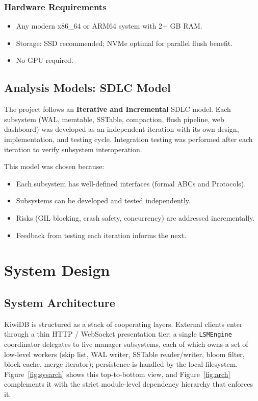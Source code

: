 \documentclass[oneside,a4paper,12pt]{book}
\begin{document}
\subsection{Hardware Requirements}
\begin{itemize}[leftmargin=2em]
    \item Any modern x86\_64 or ARM64 system with 2+ GB RAM.
    \item Storage: SSD recommended; NVMe optimal for parallel flush benefit.
    \item No GPU required.
\end{itemize}

\section{Analysis Models: SDLC Model}

The project follows an \textbf{Iterative and Incremental} SDLC model. Each subsystem (WAL, memtable, SSTable, compaction, flush pipeline, web dashboard) was developed as an independent iteration with its own design, implementation, and testing cycle. Integration testing was performed after each iteration to verify subsystem interoperation.

This model was chosen because:
\begin{itemize}[leftmargin=2em]
    \item Each subsystem has well-defined interfaces (formal ABCs and Protocols).
    \item Subsystems can be developed and tested independently.
    \item Risks (GIL blocking, crash safety, concurrency) are addressed incrementally.
    \item Feedback from testing each iteration informs the next.
\end{itemize}


\chapter{System Design}

\section{System Architecture}

KiwiDB is structured as a stack of cooperating layers. External clients enter through a thin HTTP / WebSocket presentation tier; a single \texttt{LSMEngine} coordinator delegates to five manager subsystems, each of which owns a set of low-level workers (skip list, WAL writer, SSTable reader/writer, bloom filter, block cache, merge iterator); persistence is handled by the local filesystem. Figure~\ref{fig:sysarch} shows this top-to-bottom view, and Figure~\ref{fig:arch} complements it with the strict module-level dependency hierarchy that enforces it.
\end{document}
